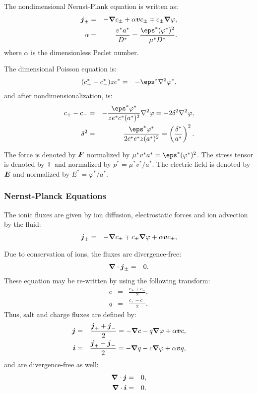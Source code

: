 The nondimensional Nernst-Plank equation is written as:
\begin{eqnarray}
\bj_\pm &=& 
-\bnabla c_\pm + \alpha \bv c_\pm \mp c_\pm \bnabla \varphi, \\
\alpha &=&
\frac{v^* a^*}{D^*} = \frac{\eps^* (\varphi^*)^2}{\mu^* D^*}.
\end{eqnarray}
where $\alpha$ is the dimensionless Peclet number.

The dimensional Poisson equation is:
\begin{eqnarray}
(c^*_+ - c^*_-) z e^* &=& -\eps^* \Laplacian \varphi^*,
\end{eqnarray}
and after nondimensionalization, is:
\begin{eqnarray}
c_+ - c_- &=& -\frac{\eps^* \varphi^*}{z e^* c^* (a^*)^2} \Laplacian \varphi = 
-2\delta^2 \Laplacian \varphi,
\\
\delta^2 &=& \frac{\eps^* \varphi^*}{2c^* e^* z (a^*)^2} = 
\pars{\frac{\delta^*}{a^*}}^2.
\end{eqnarray}

The force is denoted by $\boldsymbol{F}$ normalized by $\mu^* v^* a^* = \eps^* (\varphi^*)^2$.
The stress tensor is denoted by $\mathsf{T}$ and normalized by $p^* = \mu^* v^* / a^*$.
The electric field is denoted by $\boldsymbol{E}$ and normalized by $E^* = \varphi^* / a^*$.

\subsubsection{Nernst-Planck Equations}
The ionic fluxes are given by ion diffusion, electrostatic forces and ion advection by the fluid:
\begin{eqnarray}
  \boldsymbol{j}_\pm &=& -\boldsymbol{\nabla} c_\pm \mp c_\pm \boldsymbol{\nabla} \varphi + \alpha \boldsymbol{v} c_\pm,
\end{eqnarray}

Due to conservation of ions, the fluxes are divergence-free:
\begin{eqnarray}
\boldsymbol{\nabla} \cdot \boldsymbol{j}_\pm &=& 0.
\end{eqnarray}
These equation may be re-written by using the following transform:
\begin{eqnarray}
  c &=& \frac{c_+ + c_-}{2},\\
  q &=& \frac{c_+ - c_-}{2}.
\end{eqnarray}
Thus, salt and charge fluxes are defined by:
\begin{eqnarray}
  \boldsymbol{j} &=& \frac{\boldsymbol{j}_+ + \boldsymbol{j}_-}{2} = -\boldsymbol{\nabla} c - q \boldsymbol{\nabla} \varphi + \alpha \boldsymbol{v} c, \\
  \boldsymbol{i} &=& \frac{\boldsymbol{j}_+ - \boldsymbol{j}_-}{2} = -\boldsymbol{\nabla} q - c \boldsymbol{\nabla} \varphi + \alpha \boldsymbol{v} q,
\end{eqnarray}
and are divergence-free as well:
\begin{eqnarray}
\boldsymbol{\nabla} \cdot \boldsymbol{j} &=& 0, \\
\boldsymbol{\nabla} \cdot \boldsymbol{i} &=& 0. 
\end{eqnarray}

